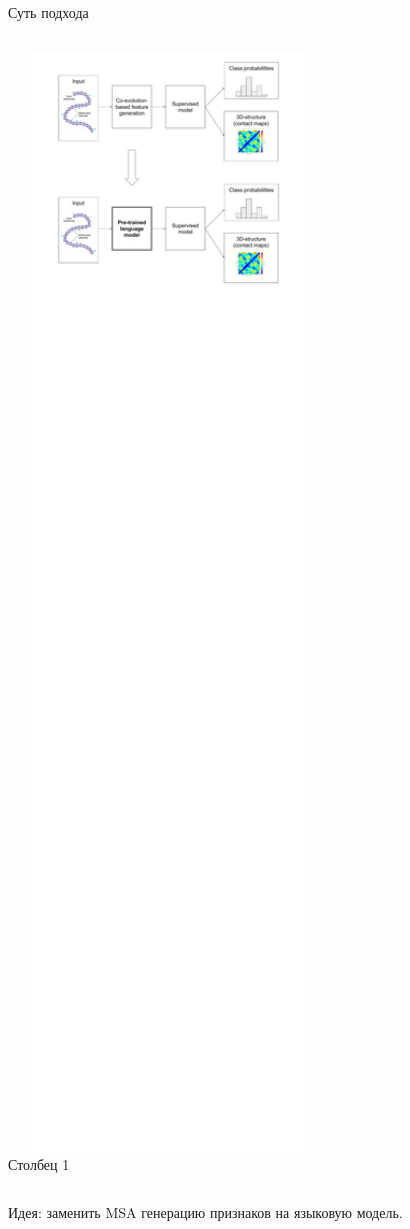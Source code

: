 \documentclass{beamer}
\begin{document}
\begin{frame}{Суть подхода}



\begin{columns}[c]
\includegraphics[width=1.0\textwidth]{figures/figure1.pdf}
    Столбец 1
\end{columns}

\bigskip
{\color{red}Идея:} заменить MSA генерацию признаков на языковую модель.
\end{frame}
\end{document}
